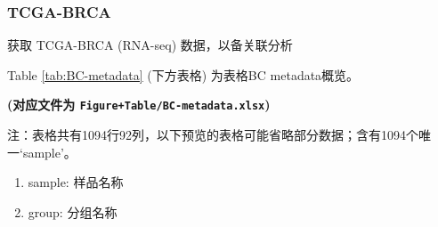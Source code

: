 \documentclass[
]{article}
\providecommand{\tightlist}{%
  \setlength{\itemsep}{0pt}\setlength{\parskip}{0pt}}
\begin{document}
\hypertarget{tcga-brca}{%
\subsubsection{TCGA-BRCA}\label{tcga-brca}}

获取 TCGA-BRCA (RNA-seq) 数据，以备关联分析

Table \ref{tab:BC-metadata} (下方表格) 为表格BC metadata概览。

\textbf{(对应文件为 \texttt{Figure+Table/BC-metadata.xlsx})}

\begin{center}\begin{tcolorbox}[colback=gray!10, colframe=gray!50, width=0.9\linewidth, arc=1mm, boxrule=0.5pt]注：表格共有1094行92列，以下预览的表格可能省略部分数据；含有1094个唯一`sample'。
\end{tcolorbox}
\end{center}
\begin{center}\begin{tcolorbox}[colback=gray!10, colframe=gray!50, width=0.9\linewidth, arc=1mm, boxrule=0.5pt]\begin{enumerate}\tightlist
\item sample:  样品名称
\item group:  分组名称
\end{enumerate}\end{tcolorbox}
\end{center}
\end{document}
